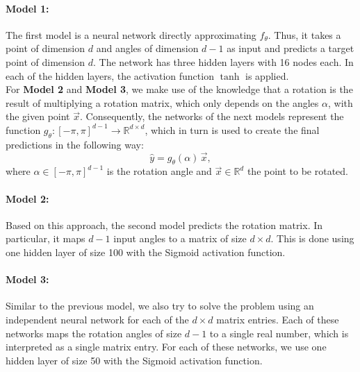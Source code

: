 \paragraph{Model 1:}The first model is a neural network directly approximating $f_\theta$. Thus, it takes a point of dimension $d$ and angles of dimension $d-1$ as input and predicts a target point of dimension $d$. The network has three hidden layers with 16 nodes each. In each of the hidden layers, the activation function $\tanh$ is applied.\\

For \textbf{Model 2} and \textbf{Model 3}, we make use of the knowledge that a rotation is the result of multiplying a rotation matrix, which only depends on the angles $\alpha$, with the given point $\vec{x}$. Consequently, the networks of the next models represent the function $g_\theta: [-\pi, \pi]^{d-1} \to \mathbb{R}^{d \times d}$, which in turn is used to create the final predictions in the following way:
\begin{equation}
\label{eq:rot_pred}
\hat{y} = g_\theta(\alpha) \, \vec{x},
\end{equation}
where $\alpha \in [-\pi, \pi]^{d-1}$ is the rotation angle and $\vec{x} \in \mathbb{R}^d$ the point to be rotated.

\paragraph{Model 2:} Based on this approach, the second model predicts the rotation matrix. In particular, it maps $d-1$ input angles to a matrix of size $d \times d$. This is done using one hidden layer of size 100 with the Sigmoid activation function. 

\paragraph{Model 3:} Similar to the previous model, we also try to solve the problem using an independent neural network for each of the $d \times d$ matrix entries. Each of these networks maps the rotation angles of size $d-1$ to a single real number, which is interpreted as a single matrix entry. For each of these networks, we use one hidden layer of size 50 with the Sigmoid activation function.\\

